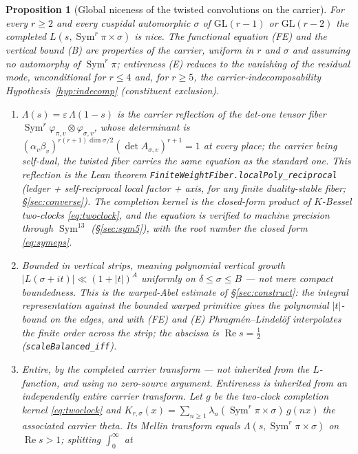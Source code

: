 \documentclass[11pt]{article}
\newtheorem{proposition}[theorem]{Proposition}
\theoremstyle{definition}
\renewcommand{\Re}{\operatorname{Re}}
\newcommand{\Sym}{\operatorname{Sym}}
\begin{document}
\begin{proposition}[Global niceness of the twisted convolutions on the carrier]\label{prop:niceness}
For every $r\ge2$ and every cuspidal automorphic $\sigma$ of $\mathrm{GL}(r-1)$ or $\mathrm{GL}(r-2)$
the completed $L(s,\Sym^r\pi\times\sigma)$ is nice. The functional equation \textup{(FE)} and the vertical
bound \textup{(B)} are properties of the carrier, uniform in $r$ and $\sigma$ and assuming no automorphy of
$\Sym^r\pi$; entireness \textup{(E)} reduces to the vanishing of the residual mode, unconditional for $r\le4$
and, for $r\ge5$, the carrier-indecomposability Hypothesis~\ref{hyp:indecomp} (constituent exclusion).
\begin{enumerate}
\item[\textup{(FE)}] $\Lambda(s)=\varepsilon\,\Lambda(1-s)$ is the carrier reflection of the det-one
tensor fiber $\Sym^r\varphi_{\pi,v}\otimes\varphi_{\sigma,v}$, whose determinant is
$(\alpha_v\beta_v)^{r(r+1)\dim\sigma/2}(\det A_{\sigma,v})^{r+1}=1$ at every place; the carrier being
self-dual, the twisted fiber carries the same equation as the standard one. This reflection is the Lean
theorem \texttt{FiniteWeightFiber.localPoly\_reciprocal} (ledger + self-reciprocal local factor + axis,
for any finite duality-stable fiber; \S\ref{sec:converse}). The completion kernel is the
closed-form product of $K$-Bessel two-clocks \eqref{eq:twoclock}, and the equation is verified to machine
precision through $\Sym^{13}$ (\S\ref{sec:sym5}), with the root number the closed form \eqref{eq:symeps}.
\item[\textup{(B)}] \emph{Bounded in vertical strips}, meaning polynomial vertical growth
$|L(\sigma+it)|\ll(1+|t|)^A$ uniformly on $\delta\le\sigma\le B$ --- not mere compact boundedness. This is
the warped-Abel estimate of \S\ref{sec:construct}: the integral representation against the bounded warped
primitive gives the polynomial $|t|$-bound on the edges, and with \textup{(FE)} and \textup{(E)}
Phragm\'en--Lindel\"of interpolates the finite order across the strip; the abscissa is $\Re s=\tfrac12$
(\texttt{scaleBalanced\_iff}).
\item[\textup{(E)}] \emph{Entire}, by the completed carrier transform --- \emph{not} inherited from the
$L$-function, and using no zero-source argument. Entireness is inherited from an independently entire
carrier transform. Let $g$ be the two-clock completion kernel \eqref{eq:twoclock} and
$K_{r,\sigma}(x)=\sum_{n\ge1}\lambda_n(\Sym^r\pi\times\sigma)\,g(nx)$ the associated carrier theta. Its
Mellin transform equals $\Lambda(s,\Sym^r\pi\times\sigma)$ on $\Re s>1$; splitting $\int_0^\infty$ at

\end{enumerate}
\end{proposition}
\end{document}
